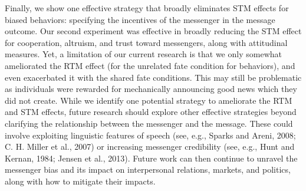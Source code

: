 Finally, we show one effective strategy that broadly eliminates STM
effects for biased behaviors: specifying the incentives of the messenger
in the message outcome. Our second experiment was effective in broadly
reducing the STM effect for cooperation, altruism, and trust toward
messengers, along with attitudinal measures. Yet, a limitation of our
current research is that we only somewhat ameliorated the RTM effect (for the unrelated fate condition for behaviors), and even
exacerbated it with the shared fate conditions. This may still be
problematic as individuals were rewarded for mechanically announcing
good news which they did not create. While we identify one potential
strategy to ameliorate the RTM and STM effects, future research should
explore other effective strategies beyond clarifying the relationship
between the messenger and the message. These could involve exploiting
linguistic features of speech (see, e.g., Sparks and Areni, 2008; C. H.
Miller et al., 2007) or increasing messenger credibility (see, e.g.,
Hunt and Kernan, 1984; Jensen et al., 2013). Future work can then
continue to unravel the messenger bias and its impact on interpersonal
relations, markets, and politics, along with how to mitigate their
impacts.

